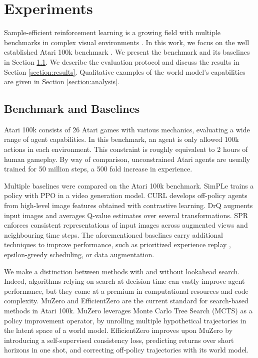 \section{Experiments}
\label{section:experiments}

Sample-efficient reinforcement learning is a growing field with multiple benchmarks in complex visual environments \citep{crafter, minerl}. In this work, we focus on the well established Atari 100k benchmark \citep{simple}. We present the benchmark and its baselines in Section \ref{section:benchmark_baselines}. We describe the evaluation protocol and discuss the results in Section \ref{section:results}. Qualitative examples of the world model's capabilities are given in Section \ref{section:analysis}.


\subsection{Benchmark and Baselines}
\label{section:benchmark_baselines}





Atari 100k consists of 26 Atari games \citep{ale} with various mechanics, evaluating a wide range of agent capabilities. In this benchmark, an agent is only allowed 100k actions in each environment. This constraint is roughly equivalent to 2 hours of human gameplay. By way of comparison, unconstrained Atari agents are usually trained for 50 million steps, a 500 fold increase in experience. 

Multiple baselines were compared on the Atari 100k benchmark. SimPLe \citep{simple} trains a policy with PPO \citep{ppo} in a video generation model. CURL \citep{curl} develops off-policy agents from high-level image features obtained with contrastive learning. DrQ \citep{drq} augments input images and averages Q-value estimates over several transformations. SPR \citep{spr} enforces consistent representations of input images across augmented views and neighbouring time steps. The aforementioned baselines carry additional techniques to improve performance, such as prioritized experience replay \citep{per}, epsilon-greedy scheduling, or data augmentation.

We make a distinction between methods with and without lookahead search. Indeed, algorithms relying on search at decision time \citep{alphago,alphazero,muzero} can vastly improve agent performance, but they come at a premium in computational resources and code complexity. MuZero \citep{muzero} and EfficientZero \citep{efficientzero} are the current standard for search-based methods in Atari 100k. MuZero leverages Monte Carlo Tree Search (MCTS) \citep{mcts_bandit, mcts_go} as a policy improvement operator, by unrolling multiple hypothetical trajectories in the latent space of a world model. EfficientZero improves upon MuZero by introducing a self-supervised consistency loss, predicting returns over short horizons in one shot, and correcting off-policy trajectories with its world model.

